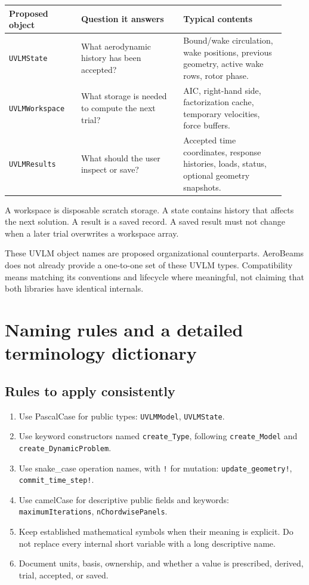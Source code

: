 \documentclass[11pt,a4paper]{article}
\newcommand{\code}{\nolinkurl}
\begin{document}
\begin{longtable}{@{}L{0.24\linewidth}L{0.34\linewidth}L{0.34\linewidth}@{}}
\toprule
Proposed object & Question it answers & Typical contents\\
\midrule\endhead
\code{UVLMState} & What aerodynamic history has been accepted? & Bound/wake
circulation, wake positions, previous geometry, active wake rows, rotor phase.\\
\code{UVLMWorkspace} & What storage is needed to compute the next trial? & AIC,
right-hand side, factorization cache, temporary velocities, force buffers.\\
\code{UVLMResults} & What should the user inspect or save? & Accepted time
coordinates, response histories, loads, status, optional geometry snapshots.\\
\bottomrule
\end{longtable}

A workspace is disposable scratch storage. A state contains history that
affects the next solution. A result is a saved record. A saved result must not
change when a later trial overwrites a workspace array.

These UVLM object names are proposed organizational counterparts. AeroBeams
does not already provide a one-to-one set of these UVLM types. Compatibility
means matching its conventions and lifecycle where meaningful, not claiming
that both libraries have identical internals.

\section{Naming rules and a detailed terminology dictionary}
\label{sec:dictionary}

\subsection{Rules to apply consistently}

\begin{enumerate}
\item Use PascalCase for public types: \code{UVLMModel}, \code{UVLMState}.
\item Use keyword constructors named \code{create_Type}, following
\code{create_Model} and \code{create_DynamicProblem}.
\item Use snake_case operation names, with \code{!} for mutation:
\code{update_geometry!}, \code{commit_time_step!}.
\item Use camelCase for descriptive public fields and keywords:
\code{maximumIterations}, \code{nChordwisePanels}.
\item Keep established mathematical symbols when their meaning is explicit.
Do not replace every internal short variable with a long descriptive name.
\item Document units, basis, ownership, and whether a value is prescribed,
derived, trial, accepted, or saved.
\end{enumerate}
\end{document}

